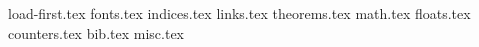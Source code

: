 
{load-first.tex}
{fonts.tex}
{indices.tex}
{links.tex}
{theorems.tex}
{math.tex}
{floats.tex}
{counters.tex}
{bib.tex}
{misc.tex}

